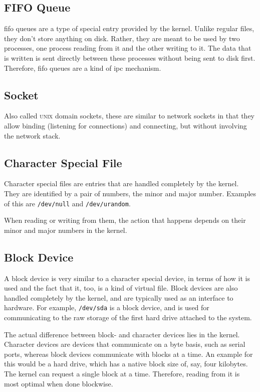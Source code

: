 \documentclass[a4paper]{article}
\begin{document}
\subsection{FIFO Queue}

\gls{fifo} queues are a type of special entry provided by the kernel. Unlike regular files, they don't store anything on disk. Rather, they are meant to be used by two processes, one process reading from it and the other writing to it. The data that is written is sent directly between these processes without being sent to disk first. Therefore, \gls{fifo} queues are a kind of \gls{ipc} mechanism.

\subsection{Socket}

Also called \textsc{unix} domain sockets, these are similar to network sockets in that they allow binding (listening for connections) and connecting, but without involving the network stack.

\subsection{Character Special File}

Character special files are entries that are handled completely by the kernel. They are identified by a pair of numbers, the minor and major number. Examples of this are \verb|/dev/null| and \verb|/dev/urandom|.

When reading or writing from them, the action that happens depends on their minor and major numbers in the kernel.


\subsection{Block Device}

A block device is very similar to a character special device, in terms of how it is used and the fact that it, too, is a kind of virtual file. Block devices are also handled completely by the kernel, and are typically used as an interface to hardware. For example, \verb|/dev/sda| is a block device, and is used for communicating to the raw storage of the first hard drive attached to the system. 

The actual difference between block- and character devices lies in the kernel. Character devices are devices that communicate on a byte basis, such as serial ports, whereas block devices communicate with blocks at a time. An example for this would be a hard drive, which has a native block size of, say, four kilobytes. The kernel can request a single block at a time. Therefore, reading from it is most optimal when done blockwise.
\end{document}
